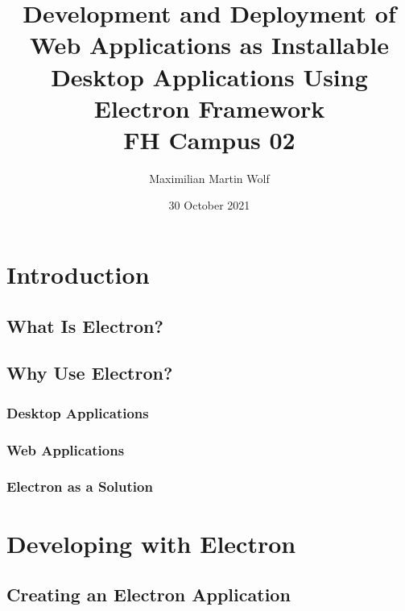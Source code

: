 \documentclass[11pt]{article}
\title{
        {Development and Deployment of Web Applications as Installable Desktop Applications Using
    Electron Framework}\\
    {\large FH Campus 02}\\
}
\author{Maximilian Martin Wolf}
\date{30 October 2021}
\begin{document}
    \maketitle
    \pagebreak
    \tableofcontents
    \pagebreak


    \section{Introduction}\label{sec:introduction}
    \setcounter{tocdepth}{3}

    \subsection{What Is Electron?}\label{subsec:what-is-electron}
    

    \subsection{Why Use Electron?}\label{subsec:why-use-electron}
    

    \subsubsection{Desktop Applications}\label{subsubsec:desktop-applications}
    

    \subsubsection{Web Applications}\label{subsubsec:web-applications}
    

    \subsubsection{Electron as a Solution}\label{subsubsec:electron-as-solution}
    

    \section{Developing with Electron}\label{sec:method}
    
    
    
    
    \subsection{Creating an Electron Application}\label{subsec:developing-with-electron-creation}
    
\end{document}
